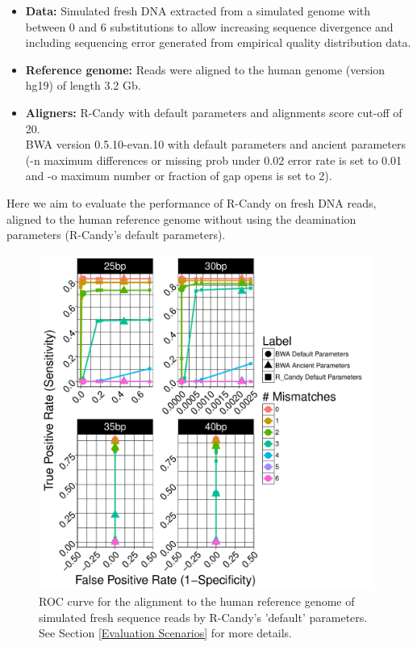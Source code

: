 \documentclass[11pt,a4paper]{report}
\begin{document}
 \begin{itemize}
 
   \item \textbf{Data:} Simulated fresh DNA extracted from a simulated genome 
   with between 0 and 6 substitutions to allow increasing sequence divergence
   and including sequencing error generated from empirical quality distribution
   data.
   
   \item \textbf{Reference genome:} Reads were aligned to the human genome 
   (version hg19) of length 3.2 Gb.

    \item \textbf{Aligners:} 
    R-Candy with default parameters and alignments score cut-off of 20. \\
    BWA version 0.5.10-evan.10 with default parameters and ancient parameters
    (-n maximum differences or missing prob under 0.02 error rate is set to 0.01 
     and -o maximum number or fraction of gap opens is set to 2)\cite{green2010draft}.

 \end{itemize}
	
	
Here we aim to evaluate the performance of R-Candy on fresh DNA reads, aligned 
to the human reference genome without using the deamination parameters (R-Candy's 
default parameters).


\begin{figure}[H]
\centering
\includegraphics[width=11cm]{pictures/f_DS6_emp.pdf}
\caption{ 
ROC curve for the alignment to the human reference genome of simulated 
fresh sequence reads by R-Candy's 'default' parameters. See Section 
\ref{Evaluation Scenarios} 
for more details.
}
\label{DS6_emp}
\end{figure}
 
\end{document}
